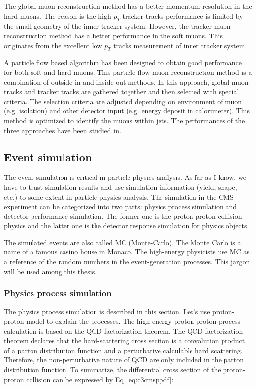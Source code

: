 The global muon reconstruction method has a better momentum resolution in the hard muons. The reason is the high $p_{T}$ tracker tracks performance is limited by the small geometry of the inner tracker system. However, the tracker muon reconstruction method has a better performance in the soft muons. This originates from the excellent low $p_{T}$ tracks measurement of inner tracker system. 

A particle flow based algorithm has been designed to obtain good performance for both soft and hard muons. This particle flow muon reconstruction method is a combination of outside-in and inside-out methods. In this approach, global muon tracks and tracker tracks are gathered together and then selected with special criteria. The selection criteria are adjusted depending on environment of muon (e.g. isolation) and other detector input (e.g. energy deposit in calorimeter). This method is optimized to identify the muons within jets. The performances of the three approaches have been studied in\cite{Chatrchyan:2012xi}. 

\subsection{Event simulation}
The event simulation is critical in particle physics analysis. As far as I know, we have to trust simulation results and use simulation information (yield, shape, etc.) to some extent in particle physics analysis. The simulation in the CMS experiment can be categorized into two parts: physics process simulation and detector performance simulation. The former one is the proton-proton collision physics and the latter one is the detector response simulation for physics objects. 

The simulated events are also called MC (Monte-Carlo). The Monte Carlo is a name of a famous casino house in Monaco. The high-energy physicists use MC as a reference of the random numbers in the event-generation processes. This jargon will be used among this thesis. 

\subsubsection{Physics process simulation}

The physics process simulation is described in this section. Let’s use proton-proton model to explain the processes. The high-energy proton-proton process calculation is based on the QCD factorization theorem\cite{Collins:1989gx}. The QCD factorization theorem declares that the hard-scattering cross section is a convolution product of a parton distribution function and a perturbative calculable hard scattering. Therefore, the non-perturbative nature of QCD are only included in the parton distribution function. To summarize, the differential cross section of the proton-proton collision can be expressed by Eq~\ref{eq:c3cmsppdf}:

